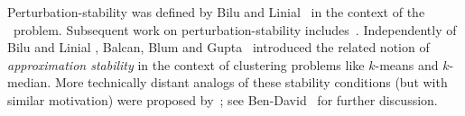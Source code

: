 Perturbation-stability was defined by
Bilu and Linial~\cite{bilu2012stable} 
in the context of the \MaxCut\
problem.  Subsequent work on perturbation-stability
includes~\cite{bilu2012practically,makarychevSODA14,angelidakisSTOC17,balcan2012clustering,balcan2015k,awasthi2012center,reyzin2012data,mihalak2011complexity,balcan2010nash}.
Independently of
Bilu and Linial \cite{bilu2012stable}, Balcan, Blum and
Gupta~\cite{balcan2009approximate} introduced the related notion of
\textit{approximation stability} in the context of clustering problems
like $k$-means and $k$-median.  
More technically distant analogs of these stability conditions (but
with similar motivation) were proposed by~\cite{ackerman2009clusterability,daniely2012clustering,ostrovsky2006effectiveness}; see
Ben-David~\cite{ben2015computational} for further discussion.



